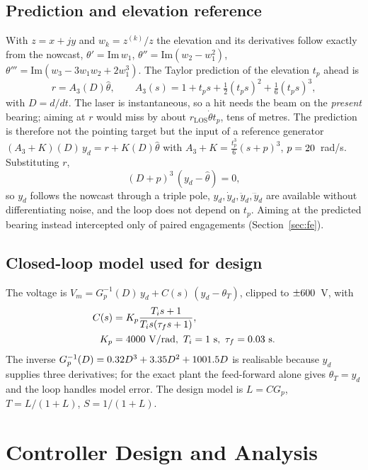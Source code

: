 \documentclass[conference]{IEEEtran}
\begin{document}
\subsection{Prediction and elevation reference}\label{sec:pred}
With $z=x+jy$ and $w_k=z^{(k)}/z$ the elevation and its derivatives follow exactly from the nowcast, $\theta'=\mathrm{Im}\,w_1$, $\theta''=\mathrm{Im}(w_2-w_1^2)$, $\theta'''=\mathrm{Im}(w_3-3w_1w_2+2w_1^3)$. The Taylor prediction of the elevation $t_p$ ahead is
\begin{equation}
r=A_3(D)\hat\theta,\qquad A_3(s)=1+t_ps+\tfrac12(t_ps)^2+\tfrac16(t_ps)^3,
\end{equation}
with $D=d/dt$. The laser is instantaneous, so a hit needs the beam on the \emph{present} bearing; aiming at $r$ would miss by about $r_\mathrm{LOS}\dot\theta t_p$, tens of metres. The prediction is therefore not the pointing target but the input of a reference generator $(A_3+K)(D)\,y_d=r+K(D)\hat\theta$ with $A_3+K=\tfrac{t_p^3}{6}(s+p)^3$, $p=20$~rad/s. Substituting $r$,
\begin{equation}
(D+p)^3\,(y_d-\hat\theta)=0,
\end{equation}
so $y_d$ follows the nowcast through a triple pole, $y_d,\dot y_d,\ddot y_d,\dddot y_d$ are available without differentiating noise, and the loop does not depend on $t_p$. Aiming at the predicted bearing instead intercepted only \AimInt{} of \AblN{} paired engagements (Section~\ref{sec:fe}).

\subsection{Closed-loop model used for design}\label{sec:loopmodel}
The voltage is $V_m=G_p^{-1}(D)\,y_d+C(s)\,(y_d-\theta_T)$, clipped to $\pm600$~V, with
\begin{equation}
\begin{split}
C(s)&=K_p\frac{T_is+1}{T_is(\tau_fs+1)},\\
K_p&=\DesKp~\mathrm{V/rad},\ T_i=\PiTi~\mathrm{s},\ \tau_f=\PiTauF~\mathrm{s}.
\end{split}
\end{equation}
The inverse $G_p^{-1}(D)=0.32 D^3+3.35 D^2+1001.5 D$ is realisable because $y_d$ supplies three derivatives; for the exact plant the feed-forward alone gives $\theta_T=y_d$ and the loop handles model error. The design model is $L=CG_p$, $T=L/(1+L)$, $S=1/(1+L)$.

\section{Controller Design and Analysis}
\end{document}
